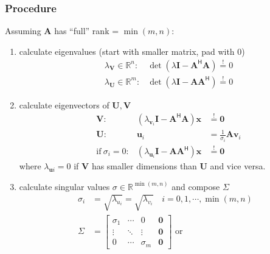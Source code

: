 \subsubsection{Procedure}
Assuming $\mathbf{A}$ has ``full'' rank = $\min(m,n)$:
\begin{enumerate}
    \item calculate eigenvalues (start with smaller matrix, pad with 0)
          \noindent\begin{align*}
               & \lambda_{\mathbf{V}}\in \mathbb{R}^n: & \det\left(\lambda \mathbf{I}-\mathbf{A}^{\mathsf{H}}\mathbf{A}\right)\overset{!}{=}0 \\
               & \lambda_{\mathbf{U}}\in \mathbb{R}^m: & \det\left(\lambda \mathbf{I}-\mathbf{AA}^{\mathsf{H}}\right)\overset{!}{=}0
          \end{align*}
    \item calculate eigenvectors of $\mathbf{U},\mathbf{V}$
          \noindent\begin{align*}
               & \mathbf{V}:                & \left(\lambda_{\mathbf{v}_i} \mathbf{I} -\mathbf{A}^{\mathsf{H}} \mathbf{A}\right)\mathbf{x} & \overset{!}{=}\mathbf{0}          \\
               & \mathbf{U}:                & \mathbf{u}_i                                                                                 & = \frac{1}{\sigma_i}\mathbf{Av}_i \\
               & \mathrm{if}~\sigma_i = 0 : & \left(\lambda_{\mathbf{u}_i} \mathbf{I} -\mathbf{AA}^{\mathsf{H}}\right)\mathbf{x}           & \overset{!}{=}\mathbf{0}
          \end{align*}
          where $\lambda_{\mathbf{u}i}=0$ if $\mathbf{V}$ has smaller dimensions than $\mathbf{U}$ and vice versa.
    \item calculate singular values $\sigma\in \mathbb{R}^{\min(m,n)}$ and compose $\Sigma$
          \noindent\begin{align*}
              \sigma_i & = \sqrt{\lambda_{u_i}} = \sqrt{\lambda_{v_i}}\quad i=0,1,\cdots, \min(m,n) \\
              \Sigma   & = \begin{bmatrix}
                               \sigma_1 & \cdots & 0          & \mathbf{0} \\
                               \vdots   & \ddots & \vdots     & \mathbf{0} \\
                               0        & \cdots & \sigma_{m} & \mathbf{0}
                           \end{bmatrix}\text{ or }

\end{align*}
\end{enumerate}
